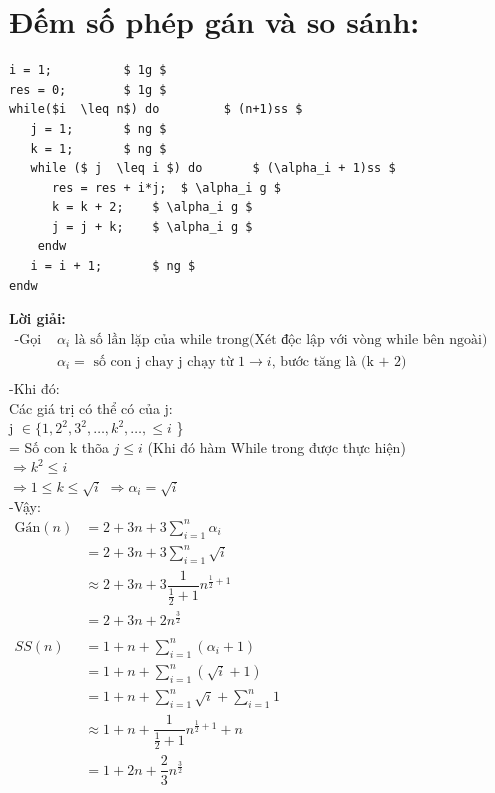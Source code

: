 \documentclass[12pt, letterpaper]{article}
\begin{document}
\section{Đếm số phép gán và so sánh:}
\begin{lstlisting}
i = 1;			$ 1g $
res = 0;		$ 1g $
while($i  \leq n$) do	      $ (n+1)ss $    
   j = 1;		$ ng $
   k = 1;		$ ng $
   while ($ j  \leq i $) do	      $ (\alpha_i + 1)ss $
      res = res + i*j;	$ \alpha_i g $
      k = k + 2;	$ \alpha_i g $
      j = j + k;	$ \alpha_i g $		
    endw
   i = i + 1;		$ ng $
endw
	\end{lstlisting}
\textbf{Lời giải:} \\
$ \begin{aligned}
		\text{-Gọi } & \alpha_i \text{ là số lần lặp của while trong(Xét độc lập với vòng while bên ngoài)}     \\
		             & \alpha_i = \text{ số con j chay j chạy từ 1} \rightarrow i \text{, bước tăng là (k + 2)} \\
	\end{aligned} $ \\
-Khi đó:\\
Các giá trị có thể có của j: \\
j $\in \{ 1, 2^2, 3^2, \ldots, k^2, \ldots, \leq i$ \}\\
= Số con k thõa $ j \leq i$ (Khi đó hàm While trong được thực hiện)\\
$\Rightarrow k^2 \leq i$\\
$\Rightarrow 1 \leq k \leq \sqrt{i}$
$\Rightarrow \alpha_i = \sqrt{i}$\\
-Vậy: \\
$ \begin{aligned}
		\text{Gán}(n) & = 2 + 3n + 3\sum^{n}_{i = 1}\alpha_i                               \\
		              & = 2 + 3n + 3\sum^{n}_{i = 1}\sqrt i                                \\
		              & \approx 2 + 3n + 3 \dfrac{1}{\frac{1}{2} + 1} n^{\frac{1}{2} + 1}  \\
		              & = 2 + 3n + 2n^\frac{3}{2}                                          \\
		\\SS(n) & = 1 + n + \sum^{n}_{i = 1}(\alpha_i + 1)\\
		              & = 1 + n + \sum^{n}_{i = 1}(\sqrt i + 1)                            \\
		              & = 1 + n + \sum^{n}_{i = 1}\sqrt i + \sum^{n}_{i = 1} 1             \\
		              & \approx 1 + n + \dfrac{1}{\frac{1}{2} + 1} n^{\frac{1}{2} + 1} + n \\
		              & = 1 + 2n + \dfrac{2}{3}n^\frac{3}{2}                               \\
	\end{aligned} $ \\
\end{document}

